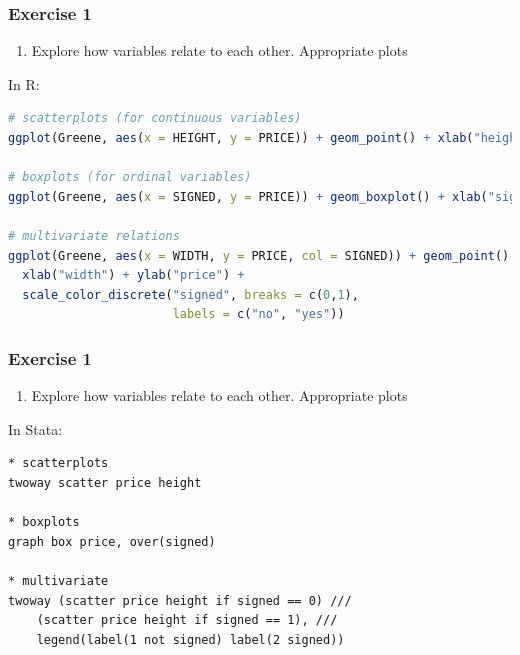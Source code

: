 \documentclass[xcolor=table]{beamer}
\begin{document}
\begin{frame}[fragile]
\frametitle{Exercise 1}
\begin{enumerate}
\item Explore how variables relate to each other. Appropriate plots \pause
\end{enumerate}
In R:
\begin{lstlisting}[language = R]
# scatterplots (for continuous variables)
ggplot(Greene, aes(x = HEIGHT, y = PRICE)) + geom_point() + xlab("height") + ylab("price")

# boxplots (for ordinal variables)
ggplot(Greene, aes(x = SIGNED, y = PRICE)) + geom_boxplot() + xlab("signed") + ylab("price")

# multivariate relations
ggplot(Greene, aes(x = WIDTH, y = PRICE, col = SIGNED)) + geom_point() + 
  xlab("width") + ylab("price") + 
  scale_color_discrete("signed", breaks = c(0,1),
                       labels = c("no", "yes"))
\end{lstlisting}
\end{frame}

\begin{frame}[fragile]
\frametitle{Exercise 1}
\begin{enumerate}
\item Explore how variables relate to each other. Appropriate plots \pause
\end{enumerate}
In Stata:
\begin{lstlisting}
* scatterplots
twoway scatter price height

* boxplots
graph box price, over(signed)

* multivariate
twoway (scatter price height if signed == 0) ///
	(scatter price height if signed == 1), ///
	legend(label(1 not signed) label(2 signed))
\end{lstlisting}
\end{frame}


\end{document}
